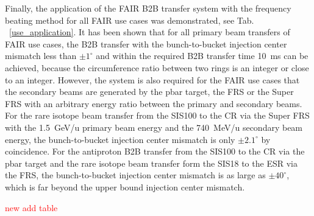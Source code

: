 Finally, the application of the FAIR B2B transfer system with the frequency beating method for all FAIR use cases was demonstrated, see Tab. ~\ref{use_application}. It has been shown that for all primary beam transfers of FAIR use cases, the B2B transfer with the bunch-to-bucket injection center mismatch less than $\pm1^\circ$ and within the required B2B transfer time \SI{10}{\ms} can be achieved, because the circumference ratio between two rings is an integer or close to an integer. However, the system is also required for the FAIR use cases that the secondary beams are generated by the pbar target, the FRS or the Super FRS with an arbitrary energy ratio between the primary and secondary beams. For the rare isotope beam transfer from the SIS100 to the CR via the Super FRS with the \SI{1.5}{GeV/u} primary beam energy and the \SI{740}{MeV/u} secondary beam energy, the bunch-to-bucket injection center mismatch is only $\pm2.1^\circ$ by coincidence. For the antiproton B2B transfer from the SIS100 to the CR via the pbar target and the rare isotope beam transfer form the SIS18 to the ESR via the FRS, the bunch-to-bucket injection center mismatch is as large as $\pm40^\circ$, which is far beyond the upper bound injection center mismatch.

\textcolor{red}{new add table}

